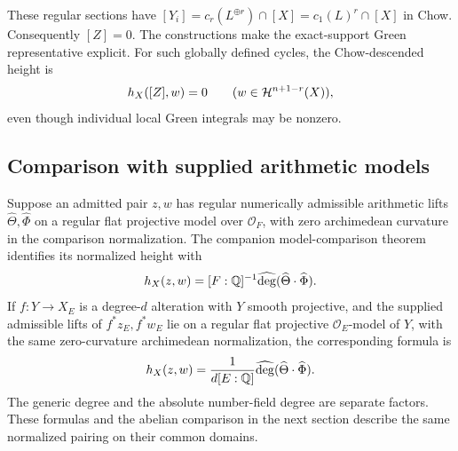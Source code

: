 These regular sections have
$[Y_i]=c_r(L^{\oplus r})\cap[X]=c_1(L)^r\cap[X]$ in Chow.
Consequently $[Z]=0$. The constructions make the exact-support
Green representative explicit. For such globally defined cycles,
the Chow-descended height is
\[
 h_X([Z],w)=0\qquad(w\in\mathcal H^{n+1-r}(X)),
\]
even though individual local Green integrals may be nonzero.

\subsection{Comparison with supplied arithmetic models}

Suppose an admitted pair $z,w$ has regular numerically admissible
arithmetic lifts $\widehat\Theta,\widehat\Phi$ on a regular flat
projective model over $\mathcal O_F$, with zero archimedean
curvature in the comparison normalization. The companion
model-comparison theorem \cite{InternalHeight} identifies its
normalized height with
\[
 h_X(z,w)=[F:\mathbb Q]^{-1}
          \widehat{\deg}(\widehat\Theta\cdot\widehat\Phi).
\]
If $f:Y\to X_E$ is a degree-$d$ alteration with $Y$ smooth
projective, and the supplied admissible lifts of
$f^*z_E,f^*w_E$ lie on a regular flat projective
$\mathcal O_E$-model of $Y$, with the same zero-curvature
archimedean normalization, the corresponding formula is
\[
 h_X(z,w)=\frac{1}{d[E:\mathbb Q]}
          \widehat{\deg}(\widehat\Theta\cdot\widehat\Phi).
\]
The generic degree and the absolute number-field degree are separate
factors. These formulas and the abelian comparison in the next
section describe the same normalized pairing on their common domains.
